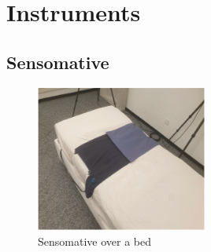 \section{Instruments}
\subsection{Sensomative}

\begin{figure}[h]
    \centering
    \includegraphics[width=0.5\textwidth]{img/sensomative.png}
    \caption{Sensomative over a bed}
    \label{fig:sensomativeBed}
\end{figure}

